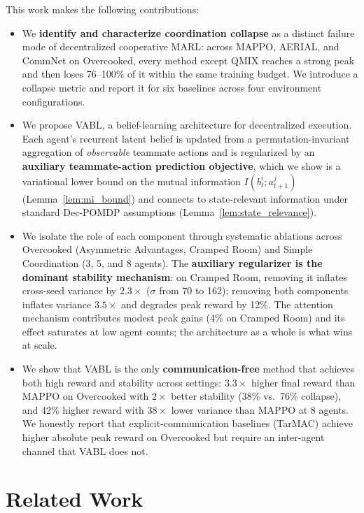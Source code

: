 \documentclass{article}
\theoremstyle{plain}
\theoremstyle{definition}
\theoremstyle{remark}
\begin{document}
This work makes the following contributions:
\begin{itemize}
  \item We \textbf{identify and characterize coordination collapse} as a distinct failure mode of decentralized cooperative MARL: across MAPPO, AERIAL, and CommNet on Overcooked, every method except QMIX reaches a strong peak and then loses 76--100\% of it within the same training budget. We introduce a collapse metric and report it for six baselines across four environment configurations.
  \item We propose VABL, a belief-learning architecture for decentralized execution. Each agent's recurrent latent belief is updated from a permutation-invariant aggregation of \emph{observable} teammate actions and is regularized by an \textbf{auxiliary teammate-action prediction objective}, which we show is a variational lower bound on the mutual information $I(b_t^i; a_{t+1}^j)$ (Lemma~\ref{lem:mi_bound}) and connects to state-relevant information under standard Dec-POMDP assumptions (Lemma~\ref{lem:state_relevance}).
  \item We isolate the role of each component through systematic ablations across Overcooked (Asymmetric Advantages, Cramped Room) and Simple Coordination (3, 5, and 8 agents). The \textbf{auxiliary regularizer is the dominant stability mechanism}: on Cramped Room, removing it inflates cross-seed variance by $2.3\times$ ($\sigma$ from 70 to 162); removing both components inflates variance $3.5\times$ and degrades peak reward by 12\%. The attention mechanism contributes modest peak gains (4\% on Cramped Room) and its effect saturates at low agent counts; the architecture as a whole is what wins at scale.
  \item We show that VABL is the only \textbf{communication-free} method that achieves both high reward and stability across settings: $3.3\times$ higher final reward than MAPPO on Overcooked with $2\times$ better stability (38\% vs.\ 76\% collapse), and 42\% higher reward with $38\times$ lower variance than MAPPO at 8 agents. We honestly report that explicit-communication baselines (TarMAC) achieve higher absolute peak reward on Overcooked but require an inter-agent channel that VABL does not.
\end{itemize}

\section{Related Work}
\end{document}
